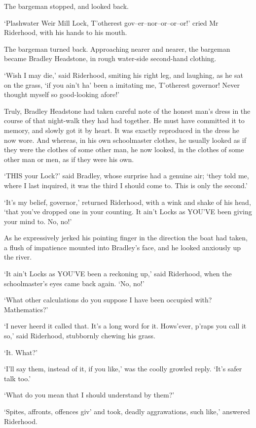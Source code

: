 The bargeman stopped, and looked back.

‘Plashwater Weir Mill Lock, T’otherest gov--er--nor--or--or--or!’ cried
Mr Riderhood, with his hands to his mouth.

The bargeman turned back. Approaching nearer and nearer, the bargeman
became Bradley Headstone, in rough water-side second-hand clothing.

‘Wish I may die,’ said Riderhood, smiting his right leg, and laughing,
as he sat on the grass, ‘if you ain’t ha’ been a imitating me,
T’otherest governor! Never thought myself so good-looking afore!’

Truly, Bradley Headstone had taken careful note of the honest man’s
dress in the course of that night-walk they had had together. He must
have committed it to memory, and slowly got it by heart. It was
exactly reproduced in the dress he now wore. And whereas, in his own
schoolmaster clothes, he usually looked as if they were the clothes of
some other man, he now looked, in the clothes of some other man or men,
as if they were his own.

‘THIS your Lock?’ said Bradley, whose surprise had a genuine air; ‘they
told me, where I last inquired, it was the third I should come to. This
is only the second.’

‘It’s my belief, governor,’ returned Riderhood, with a wink and shake of
his head, ‘that you’ve dropped one in your counting. It ain’t Locks as
YOU’VE been giving your mind to. No, no!’

As he expressively jerked his pointing finger in the direction the boat
had taken, a flush of impatience mounted into Bradley’s face, and he
looked anxiously up the river.

‘It ain’t Locks as YOU’VE been a reckoning up,’ said Riderhood, when the
schoolmaster’s eyes came back again. ‘No, no!’

‘What other calculations do you suppose I have been occupied with?
Mathematics?’

‘I never heerd it called that. It’s a long word for it. Hows’ever,
p’raps you call it so,’ said Riderhood, stubbornly chewing his grass.

‘It. What?’

‘I’ll say them, instead of it, if you like,’ was the coolly growled
reply. ‘It’s safer talk too.’

‘What do you mean that I should understand by them?’

‘Spites, affronts, offences giv’ and took, deadly aggrawations, such
like,’ answered Riderhood.

